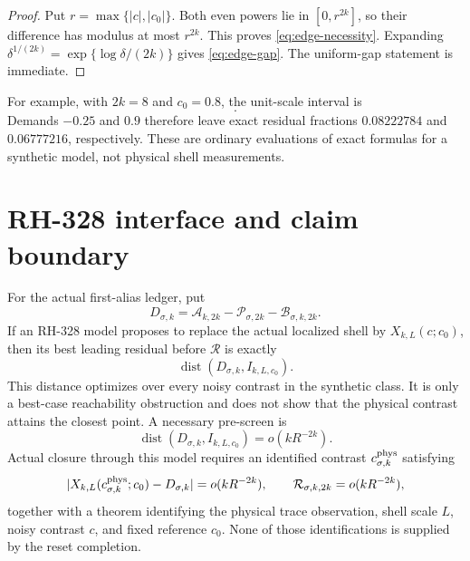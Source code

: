 \documentclass[11pt]{article}
\theoremstyle{remark}
\newcommand{\dist}{\operatorname{dist}}
\newcommand{\cA}{\mathcal A}
\newcommand{\cB}{\mathcal B}
\newcommand{\cP}{\mathcal P}
\newcommand{\cR}{\mathcal R}
\begin{document}
\begin{proof}
Put $r=\max\{|c|,|c_0|\}$.  Both even powers lie in $[0,r^{2k}]$, so their
difference has modulus at most $r^{2k}$.  This proves
\eqref{eq:edge-necessity}.  Expanding
$\delta^{1/(2k)}=\exp\{\log\delta/(2k)\}$ gives
\eqref{eq:edge-gap}.  The uniform-gap statement is immediate.
\end{proof}

For example, with $2k=8$ and $c_0=0.8$, the unit-scale interval is
\begin{equation}
 [-0.16777216,\,0.83222784].
 \label{eq:numeric-interval}
\end{equation}
Demands $-0.25$ and $0.9$ therefore leave exact residual fractions
$0.08222784$ and $0.06777216$, respectively.  These are ordinary evaluations
of exact formulas for a synthetic model, not physical shell measurements.

\section{RH-328 interface and claim boundary}

For the actual first-alias ledger, put
\begin{equation}
 D_{\sigma,k}=\cA_{k,2k}-\cP_{\sigma,2k}
               -\cB_{\sigma,k,2k}.
 \label{eq:actual-demand}
\end{equation}
If an RH-328 model proposes to replace the actual localized shell by
$X_{k,L}(c;c_0)$, then its best leading residual before $\cR$ is exactly
\begin{equation}
 \dist(D_{\sigma,k},I_{k,L,c_0}).
 \label{eq:handoff-distance}
\end{equation}
This distance optimizes over every noisy contrast in the synthetic class.
It is only a best-case reachability obstruction and does not show that the
physical contrast attains the closest point.  A necessary pre-screen is
\begin{equation}
 \dist(D_{\sigma,k},I_{k,L,c_0})=o(kR^{-2k}).
 \label{eq:reachability-screen}
\end{equation}
Actual closure through this model requires an identified contrast
$c_{\sigma,k}^{\rm phys}$ satisfying
\begin{equation}
 |X_{k,L}(c_{\sigma,k}^{\rm phys};c_0)-D_{\sigma,k}|
 =o(kR^{-2k}),
 \qquad
 \cR_{\sigma,k,2k}=o(kR^{-2k}),
 \label{eq:handoff-requirements}
\end{equation}
together with a theorem identifying the physical trace observation, shell
scale $L$, noisy contrast $c$, and fixed reference $c_0$.  None of those
identifications is supplied by the reset completion.
\end{document}
